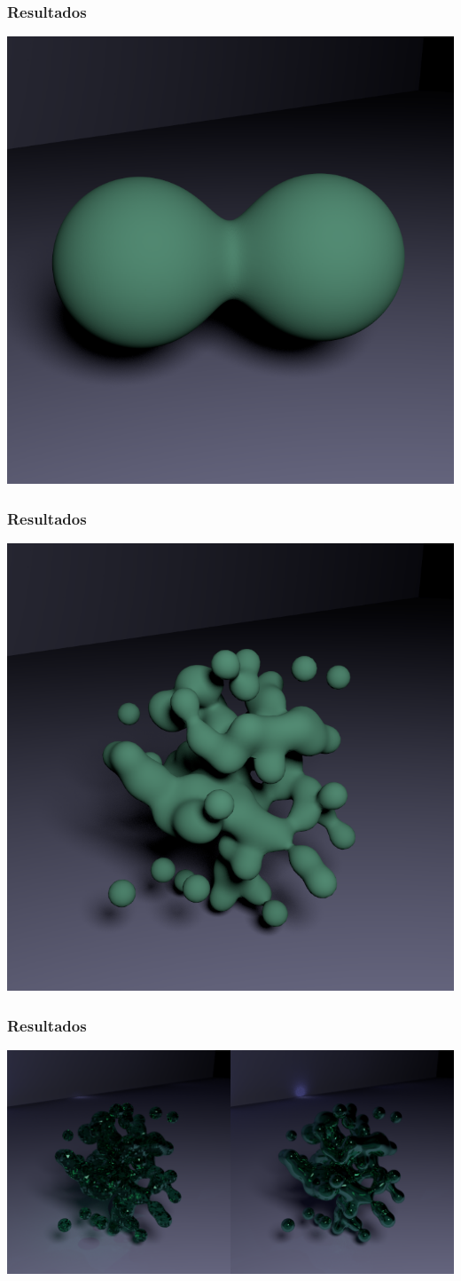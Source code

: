 \documentclass[brazil]{beamer}
\begin{document}
      \begin{frame}
        \frametitle{Resultados}
        \begin{center}
          \includegraphics[width=.6\textwidth]{imgs/metaball-good1.png}
        \end{center}
      \end{frame}
  
      \begin{frame}
        \frametitle{Resultados}
        \begin{center}
          \includegraphics[width=.6\textwidth]{imgs/blob.png}
        \end{center}
      \end{frame}

      \begin{frame}
        \frametitle{Resultados}
          \begin{center}
            \includegraphics[width=1.0\textwidth]{imgs/glass-blob-comparison.png}
          \end{center}
      \end{frame}
\end{document}
